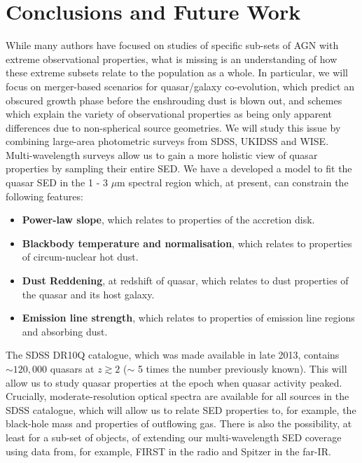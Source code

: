\newpage

\section{Conclusions and Future Work}

While many authors have focused on studies of specific sub-sets of AGN with extreme observational properties, what is missing is an understanding of how these extreme subsets relate to the population as a whole. In particular, we will focus on merger-based scenarios for quasar/galaxy co-evolution, which predict an obscured growth phase before the enshrouding dust is blown out, and schemes which explain the variety of observational properties as being only apparent differences due to non-spherical source geometries. We will study this issue by combining large-area photometric surveys from SDSS, UKIDSS and WISE. Multi-wavelength surveys allow us to gain a more holistic view of quasar properties by sampling their entire SED. We have a developed a model to fit the quasar SED in the 1 - 3 $\mu$m spectral region which, at present, can constrain the following features:

\begin{itemize}
\item {\bf Power-law slope}, which relates to properties of the accretion disk.
\item {\bf Blackbody temperature and normalisation}, which relates to properties of circum-nuclear hot dust. 
\item {\bf Dust Reddening}, at redshift of quasar, which relates to dust properties of the quasar and its host galaxy. 
\item {\bf Emission line strength}, which relates to properties of emission line regions and absorbing dust. 
\end{itemize}

The SDSS DR10Q catalogue, which was made available in late 2013, contains $\sim 120,000$ quasars at $z\gtrsim2$ ($\sim$ 5 times the number previously known). This will allow us to study quasar properties at the epoch when quasar activity peaked. Crucially, moderate-resolution optical spectra are available for all sources in the SDSS catalogue, which will allow us to relate SED properties to, for example, the black-hole mass and properties of outflowing gas. There is also the possibility, at least for a sub-set of objects, of extending our multi-wavelength SED coverage using data from, for example, FIRST in the radio and Spitzer in the far-IR. 

